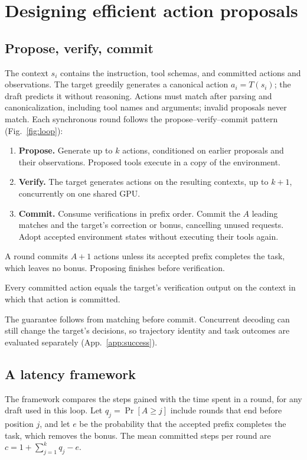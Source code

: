 \section{Designing efficient action proposals}
\subsection{Propose, verify, commit}
\label{sec:problem}\label{sec:loop}
The context $s_i$ contains the instruction, tool schemas, and committed actions and
observations. The target greedily generates a canonical action $a_i=T(s_i)$; the draft predicts it
without reasoning. Actions must match after parsing and canonicalization, including tool names
and arguments; invalid proposals never match. Each synchronous round follows the propose--verify--commit pattern~\citep{specactions}
(Fig.~\ref{fig:loop}):
\begin{enumerate}
\item \textbf{Propose.} Generate up to $k$ actions, conditioned on earlier proposals and their
observations. Proposed tools execute in a copy of the environment.
\item \textbf{Verify.} The target generates actions on the resulting contexts, up to $k+1$,
concurrently on one shared GPU.
\item \textbf{Commit.} Consume verifications in prefix order. Commit the $A$ leading matches and
the target's correction or bonus, cancelling unused requests. Adopt accepted environment states
without executing their tools again.
\end{enumerate}
A round commits $A+1$ actions unless its accepted prefix completes the task, which leaves no
bonus. Proposing finishes before verification.

\begin{property}
\label{prop:exact}
Every committed action equals the target's verification output on the context in which that action
is committed.
\end{property}
The guarantee follows from matching before commit. Concurrent decoding can still change the target's
decisions, so trajectory identity and task outcomes are evaluated separately (App.~\ref{app:success}).

\subsection{A latency framework}
\label{sec:model}
The framework compares the steps gained with the time spent in a round, for any draft used in this loop.
Let $q_j=\Pr[A\ge j]$ include rounds that end before position $j$, and let $e$ be the probability that the
accepted prefix completes the task, which removes the bonus. The mean committed steps per round are
$c=1+\sum_{j=1}^{k}q_j-e$.

